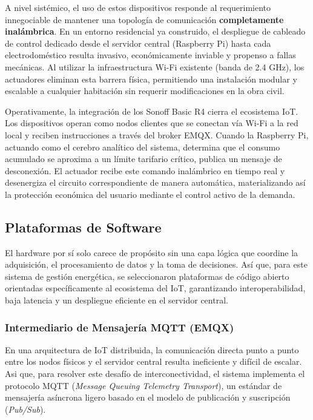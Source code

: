 
            A nivel sistémico, el uso de estos dispositivos responde al requerimiento innegociable de mantener una topología de comunicación \textbf{completamente inalámbrica}. En un entorno residencial ya construido, el despliegue de cableado de control dedicado desde el servidor central (Raspberry Pi) hasta cada electrodoméstico resulta invasivo, económicamente inviable y propenso a fallas mecánicas. Al utilizar la infraestructura Wi-Fi existente (banda de 2.4 GHz), los actuadores eliminan esta barrera física, permitiendo una instalación modular y escalable a cualquier habitación sin requerir modificaciones en la obra civil.

            Operativamente, la integración de los Sonoff Basic R4 cierra el ecosistema IoT. Los dispositivos operan como nodos clientes que se conectan vía Wi-Fi a la red local y reciben instrucciones a través del broker EMQX. Cuando la Raspberry Pi, actuando como el cerebro analítico del sistema, determina que el consumo acumulado se aproxima a un límite tarifario crítico, publica un mensaje de desconexión. El actuador recibe este comando inalámbrico en tiempo real y desenergiza el circuito correspondiente de manera automática, materializando así la protección económica del usuario mediante el control activo de la demanda.

    \subsection{Plataformas de Software}
        El hardware por sí solo carece de propósito sin una capa lógica que coordine la adquisición, el procesamiento de datos y la toma de decisiones. Así que, para este sistema de gestión energética, se seleccionaron plataformas de código abierto orientadas específicamente al ecosistema del IoT, garantizando interoperabilidad, baja latencia y un despliegue eficiente en el servidor central.

        \subsubsection{Intermediario de Mensajería MQTT (EMQX)}
            En una arquitectura de IoT distribuida, la comunicación directa punto a punto entre los nodos físicos y el servidor central resulta ineficiente y difícil de escalar. Asi que, para resolver este desafío de interconectividad, el sistema implementa el protocolo MQTT (\textit{Message Queuing Telemetry Transport}), un estándar de mensajería asíncrona ligero basado en el modelo de publicación y suscripción (\textit{Pub/Sub}).

